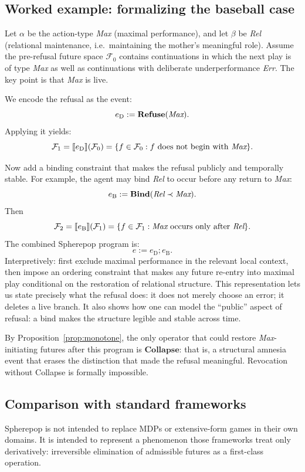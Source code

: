 \documentclass[11pt]{article}
\newcommand{\Future}{\mathcal{F}}
\begin{document}
\subsection{Worked example: formalizing the baseball case}

Let $\alpha$ be the action-type \emph{Max} (maximal performance), and let
$\beta$ be \emph{Rel} (relational maintenance, i.e.\ maintaining the mother's
meaningful role). Assume the pre-refusal future space $\Future_0$ contains
continuations in which the next play is of type \emph{Max} as well as
continuations with deliberate underperformance \emph{Err}. The key point is
that \emph{Max} is live.

We encode the refusal as the event:
\[
e_{\text{D}} := \mathbf{Refuse}(\emph{Max}).
\]
Applying it yields:
\[
\Future_1 = \llbracket e_{\text{D}} \rrbracket(\Future_0)
= \{f \in \Future_0 : f \text{ does not begin with } \emph{Max}\}.
\]

Now add a binding constraint that makes the refusal publicly and temporally
stable. For example, the agent may bind \emph{Rel} to occur before any return
to \emph{Max}:
\[
e_{\text{B}} := \mathbf{Bind}(\emph{Rel} \prec \emph{Max}).
\]
Then
\[
\Future_2 = \llbracket e_{\text{B}} \rrbracket(\Future_1)
= \{f \in \Future_1 : \emph{Max}\text{ occurs only after }\emph{Rel}\}.
\]
The combined Spherepop program is:
\[
e := e_{\text{D}} ; e_{\text{B}}.
\]
Interpretively: first exclude maximal performance in the relevant local context,
then impose an ordering constraint that makes any future re-entry into maximal
play conditional on the restoration of relational structure. This representation
lets us state precisely what the refusal does: it does not merely choose an
error; it deletes a live branch. It also shows how one can model the
``public'' aspect of refusal: a bind makes the structure legible and stable
across time.

By Proposition~\ref{prop:monotone}, the only operator that could restore
\emph{Max}-initiating futures after this program is $\mathbf{Collapse}$: that is,
a structural amnesia event that erases the distinction that made the refusal
meaningful. Revocation without Collapse is formally impossible.

\subsection{Comparison with standard frameworks}

Spherepop is not intended to replace MDPs or extensive-form games in their own
domains. It is intended to represent a phenomenon those frameworks treat only
derivatively: irreversible elimination of admissible futures as a first-class
operation.
\end{document}
